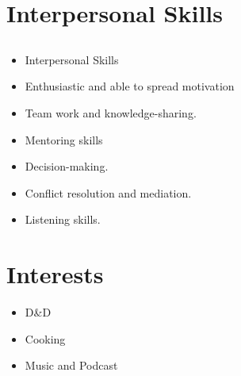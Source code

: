 \documentclass[letterpaper]{twentysecondcv} %
\begin{document}
\section{Interpersonal Skills}

\subsection{}{
	\begin{itemize}
		\item Interpersonal Skills
		\item Enthusiastic and able to spread motivation
		\item Team work and knowledge-sharing.
		\item Mentoring skills
		\item Decision-making.
		\item Conflict resolution and mediation.
		\item Listening skills.
	\end{itemize}
}

\section{Interests}
\begin{itemize}
	\item D\&D
	\item Cooking
	\item Music and Podcast
\end{itemize}
\end{document}
